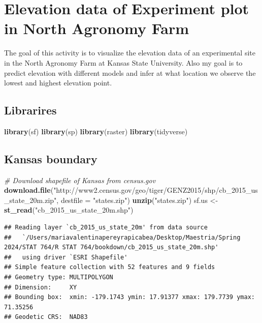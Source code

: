 \documentclass[
]{book}
\newenvironment{Shaded}{\begin{snugshade}}{\end{snugshade}}
\newcommand{\AttributeTok}[1]{\textcolor[rgb]{0.13,0.29,0.53}{#1}}
\newcommand{\CommentTok}[1]{\textcolor[rgb]{0.56,0.35,0.01}{\textit{#1}}}
\newcommand{\FunctionTok}[1]{\textcolor[rgb]{0.13,0.29,0.53}{\textbf{#1}}}
\newcommand{\NormalTok}[1]{#1}
\newcommand{\OtherTok}[1]{\textcolor[rgb]{0.56,0.35,0.01}{#1}}
\newcommand{\StringTok}[1]{\textcolor[rgb]{0.31,0.60,0.02}{#1}}
\begin{document}
\hypertarget{elevation-data-of-experiment-plot-in-north-agronomy-farm}{%
\chapter{Elevation data of Experiment plot in North Agronomy Farm}\label{elevation-data-of-experiment-plot-in-north-agronomy-farm}}

The goal of this activity is to visualize the elevation data of an experimental site in the North Agronomy Farm at Kansas State University. Also my goal is to predict elevation with different models and infer at what location we observe the lowest and highest elevation point.

\hypertarget{librarires}{%
\section{Librarires}\label{librarires}}

\begin{Shaded}
\begin{Highlighting}[]
\FunctionTok{library}\NormalTok{(sf)}
\FunctionTok{library}\NormalTok{(sp)}
\FunctionTok{library}\NormalTok{(raster)}
\FunctionTok{library}\NormalTok{(tidyverse)}
\end{Highlighting}
\end{Shaded}

\hypertarget{kansas-boundary}{%
\section{Kansas boundary}\label{kansas-boundary}}

\begin{Shaded}
\begin{Highlighting}[]
\CommentTok{\# Download shapefile of Kansas from census.gov}
\FunctionTok{download.file}\NormalTok{(}\StringTok{"http://www2.census.gov/geo/tiger/GENZ2015/shp/cb\_2015\_us\_state\_20m.zip"}\NormalTok{, }\AttributeTok{destfile =} \StringTok{"states.zip"}\NormalTok{)}
\FunctionTok{unzip}\NormalTok{(}\StringTok{"states.zip"}\NormalTok{)}
\NormalTok{sf.us }\OtherTok{\textless{}{-}} \FunctionTok{st\_read}\NormalTok{(}\StringTok{"cb\_2015\_us\_state\_20m.shp"}\NormalTok{)}
\end{Highlighting}
\end{Shaded}

\begin{verbatim}
## Reading layer `cb_2015_us_state_20m' from data source 
##   `/Users/mariavalentinapereyrapicabea/Desktop/Maestria/Spring 2024/STAT 764/R STAT 764/bookdown/cb_2015_us_state_20m.shp' 
##   using driver `ESRI Shapefile'
## Simple feature collection with 52 features and 9 fields
## Geometry type: MULTIPOLYGON
## Dimension:     XY
## Bounding box:  xmin: -179.1743 ymin: 17.91377 xmax: 179.7739 ymax: 71.35256
## Geodetic CRS:  NAD83
\end{verbatim}
\end{document}
